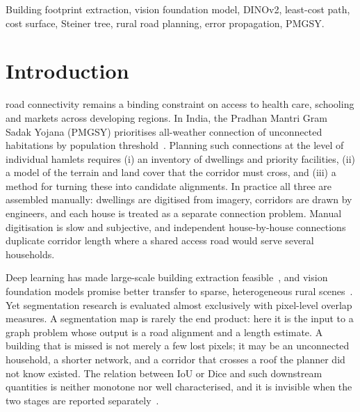 \documentclass[journal]{IEEEtran}
\begin{document}
\begin{IEEEkeywords}
Building footprint extraction, vision foundation model, DINOv2, least-cost path, cost surface, Steiner tree, rural road planning, error propagation, PMGSY.
\end{IEEEkeywords}

\section{Introduction}
 road connectivity remains a binding constraint on access to health care, schooling and markets across developing regions. In India, the Pradhan Mantri Gram Sadak Yojana (PMGSY) prioritises all-weather connection of unconnected habitations by population threshold~\cite{pmgsy}. Planning such connections at the level of individual hamlets requires (i) an inventory of dwellings and priority facilities, (ii) a model of the terrain and land cover that the corridor must cross, and (iii) a method for turning these into candidate alignments. In practice all three are assembled manually: dwellings are digitised from imagery, corridors are drawn by engineers, and each house is treated as a separate connection problem. Manual digitisation is slow and subjective, and independent house-by-house connections duplicate corridor length where a shared access road would serve several households.

Deep learning has made large-scale building extraction feasible~\cite{ji2019whu,sirko2021openbuildings}, and vision foundation models promise better transfer to sparse, heterogeneous rural scenes~\cite{oquab2023dinov2,cong2022satmae}. Yet segmentation research is evaluated almost exclusively with pixel-level overlap measures. A segmentation map is rarely the end product: here it is the input to a graph problem whose output is a road alignment and a length estimate. A building that is missed is not merely a few lost pixels; it may be an unconnected household, a shorter network, and a corridor that crosses a roof the planner did not know existed. The relation between IoU or Dice and such downstream quantities is neither monotone nor well characterised, and it is invisible when the two stages are reported separately~\cite{heuvelink1998error,foody2002status}.
\end{document}
